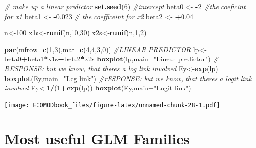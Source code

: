\documentclass[
]{book}
\newenvironment{Shaded}{\begin{snugshade}}{\end{snugshade}}
\newcommand{\AttributeTok}[1]{\textcolor[rgb]{0.13,0.29,0.53}{#1}}
\newcommand{\CommentTok}[1]{\textcolor[rgb]{0.56,0.35,0.01}{\textit{#1}}}
\newcommand{\DecValTok}[1]{\textcolor[rgb]{0.00,0.00,0.81}{#1}}
\newcommand{\FloatTok}[1]{\textcolor[rgb]{0.00,0.00,0.81}{#1}}
\newcommand{\FunctionTok}[1]{\textcolor[rgb]{0.13,0.29,0.53}{\textbf{#1}}}
\newcommand{\NormalTok}[1]{#1}
\newcommand{\OtherTok}[1]{\textcolor[rgb]{0.56,0.35,0.01}{#1}}
\newcommand{\SpecialCharTok}[1]{\textcolor[rgb]{0.81,0.36,0.00}{\textbf{#1}}}
\newcommand{\StringTok}[1]{\textcolor[rgb]{0.31,0.60,0.02}{#1}}
\begin{document}
\begin{Shaded}
\begin{Highlighting}[]
\CommentTok{\# make up a linear predictor}
\FunctionTok{set.seed}\NormalTok{(}\DecValTok{6}\NormalTok{)}
\CommentTok{\#intercept}
\NormalTok{beta0 }\OtherTok{\textless{}{-}} \SpecialCharTok{{-}}\DecValTok{2}
\CommentTok{\#the coeficint for x1}
\NormalTok{beta1 }\OtherTok{\textless{}{-}} \SpecialCharTok{{-}}\FloatTok{0.023}
\CommentTok{\# the coefficeint for x2}
\NormalTok{beta2 }\OtherTok{\textless{}{-}} \SpecialCharTok{+}\FloatTok{0.04}

\NormalTok{n}\OtherTok{\textless{}{-}}\DecValTok{100}
\NormalTok{x1s}\OtherTok{\textless{}{-}}\FunctionTok{runif}\NormalTok{(n,}\DecValTok{10}\NormalTok{,}\DecValTok{30}\NormalTok{)}
\NormalTok{x2s}\OtherTok{\textless{}{-}}\FunctionTok{runif}\NormalTok{(n,}\DecValTok{1}\NormalTok{,}\DecValTok{2}\NormalTok{)}

\FunctionTok{par}\NormalTok{(}\AttributeTok{mfrow=}\FunctionTok{c}\NormalTok{(}\DecValTok{1}\NormalTok{,}\DecValTok{3}\NormalTok{),}\AttributeTok{mar=}\FunctionTok{c}\NormalTok{(}\DecValTok{4}\NormalTok{,}\DecValTok{4}\NormalTok{,}\DecValTok{3}\NormalTok{,}\DecValTok{0}\NormalTok{))}
\CommentTok{\#LINEAR PREDICTOR}
\NormalTok{lp}\OtherTok{\textless{}{-}}\NormalTok{beta0}\SpecialCharTok{+}\NormalTok{beta1}\SpecialCharTok{*}\NormalTok{x1s}\SpecialCharTok{+}\NormalTok{beta2}\SpecialCharTok{*}\NormalTok{x2s}
\FunctionTok{boxplot}\NormalTok{(lp,}\AttributeTok{main=}\StringTok{"Linear predictor"}\NormalTok{)}
\CommentTok{\# RESPONSE: but we know, that there\textquotesingle{}s a log link involved}
\NormalTok{Ey}\OtherTok{\textless{}{-}}\FunctionTok{exp}\NormalTok{(lp)}
\FunctionTok{boxplot}\NormalTok{(Ey,}\AttributeTok{main=}\StringTok{"Log link"}\NormalTok{)}
\CommentTok{\#rESPONSE: but we know, that there\textquotesingle{}s a logit link involved}
\NormalTok{Ey}\OtherTok{\textless{}{-}}\DecValTok{1}\SpecialCharTok{/}\NormalTok{(}\DecValTok{1}\SpecialCharTok{+}\FunctionTok{exp}\NormalTok{(lp))}
\FunctionTok{boxplot}\NormalTok{(Ey,}\AttributeTok{main=}\StringTok{"Logit link"}\NormalTok{)}
\end{Highlighting}
\end{Shaded}

\texttt{[image: ECOMODbook\_files/figure-latex/unnamed-chunk-28-1.pdf]}

\hypertarget{most-useful-glm-families}{%
\section{Most useful GLM Families}\label{most-useful-glm-families}}
\end{document}
